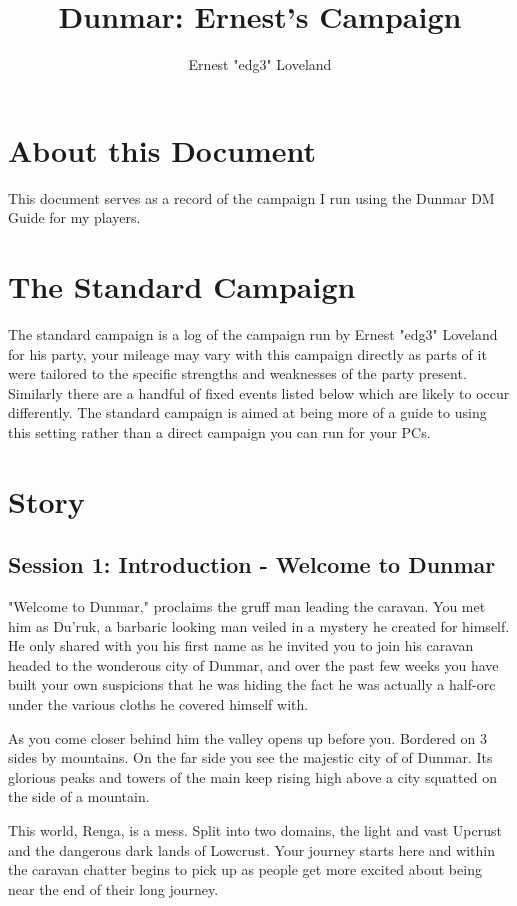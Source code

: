 \documentclass[10pt,twoside,twocolumn]{article}
\title{Dunmar: Ernest's Campaign}
\author{Ernest "edg3" Loveland}
\begin{document}
\selectfont %

\maketitle
\tableofcontents

\section{About this Document}
This document serves as a record of the campaign I run using the Dunmar DM Guide for my players.

\section{The Standard Campaign}
The standard campaign is a log of the campaign run by Ernest "edg3" Loveland for his party, your mileage may vary with this campaign directly as parts of it were tailored to the specific strengths and weaknesses of the party present. Similarly there are a handful of fixed events listed below which are likely to occur differently. The standard campaign is aimed at being more of a guide to using this setting rather than a direct campaign you can run for your PCs.

\section{Story}

\subsection{Session 1: Introduction - Welcome to Dunmar}
\begin{quotebox}
"Welcome to Dunmar," proclaims the gruff man leading the caravan. You met him as Du'ruk, a barbaric looking man veiled in a mystery he created for himself. He only shared with you his first name as he invited you to join his caravan headed to the wonderous city of Dunmar, and over the past few weeks you have built your own suspicions that he was hiding the fact he was actually a half-orc under the various cloths he covered himself with.

As you come closer behind him the valley opens up before you. Bordered on 3 sides by mountains. On the far side you see the majestic city of of Dunmar. Its glorious peaks and towers of the main keep rising high above a city squatted on the side of a mountain.

This world, Renga, is a mess. Split into two domains, the light and vast Upcrust and the dangerous dark lands of Lowcrust. Your journey starts here and within the caravan chatter begins to pick up as people get more excited about being near the end of their long journey.
\end{quotebox}
\end{document}
